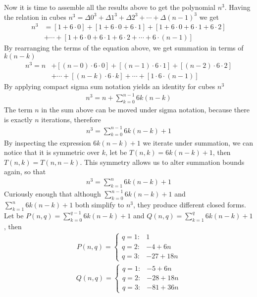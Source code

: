 Now it is time to assemble all the results above to get the polynomial $n^3$.
Having the relation in cubes $n^3 = \Delta 0^3 + \Delta 1^3 + \Delta 2^3 + \cdots + \Delta (n-1)^3$
we get
\begin{align*}
    n^3 &= [1+6\cdot0]+[1+6\cdot0+6\cdot1]+[1+6\cdot0+6\cdot1+6\cdot2] \nonumber \\
    &+ \cdots + [1+6\cdot0+6\cdot1+6\cdot2+\cdots+6\cdot(n-1)]
\end{align*}
By rearranging the terms of the equation above, we get summation in terms of $k (n-k)$
\begin{align*}
    n^3 = n &+ [(n-0) \cdot 6 \cdot 0] + [(n-1)\cdot6\cdot1] + [(n-2)\cdot6\cdot2] \\
    &+ \cdots + [(n-k)\cdot 6 \cdot k] + \cdots + [1\cdot6\cdot(n-1)]
\end{align*}
By applying compact sigma sum notation yields an identity for cubes $n^3$
\begin{align*}
    n^3 = n + \sum_{k=0}^{n-1} 6k(n-k)
\end{align*}
The term $n$ in the sum above can be moved under sigma notation, because there is exactly $n$ iterations, therefore
\begin{align*}
    n^3 = \sum_{k=0}^{n-1} 6k(n-k) + 1
\end{align*}
By inspecting the expression $6k(n-k) + 1$ we iterate under summation,
we can notice that it is symmetric over $k$, let be $T(n,k) = 6k(n-k) + 1$, then $T(n,k) = T(n,n-k)$.
This symmetry allows us to alter summation bounds again, so that
\begin{align*}
    n^3 = \sum_{k=1}^{n} 6k(n-k) + 1
\end{align*}
Curiously enough that although $\sum_{k=0}^{n-1} 6k(n-k) + 1$ and $\sum_{k=1}^{n} 6k(n-k) + 1$ both simplify to $n^3$,
they produce different closed forms.
Let be $P(n, q) = \sum_{k=0}^{q-1} 6k(n-k) + 1$ and $Q(n, q) = \sum_{k=1}^{q} 6k(n-k) + 1$, then
\begin{align*}
    P(n, q) =
    \begin{cases}
        q = 1: & 1 \\
        q = 2: & -4 + 6 n \\
        q = 3: & -27 + 18 n
    \end{cases}
\end{align*}
\begin{align*}
    Q(n, q) =
    \begin{cases}
        q = 1: & -5 + 6 n \\
        q = 2: & -28 + 18 n \\
        q = 3: & -81 + 36 n
    \end{cases}
\end{align*}
